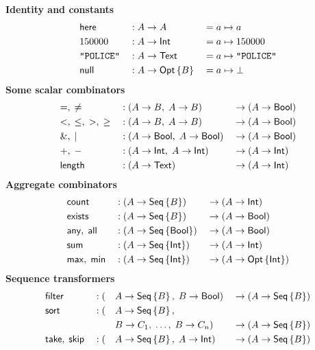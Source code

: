 \begin{table}
    \begin{framed}
    \textbf{Identity and constants}
    \begin{alignat*}{3}
        & \textup{\textsf{here}} && : A \to A && = a \mapsto a \\
        & 150000 && : A \to \textup{\textsf{Int}} && = a \mapsto 150000 \\
        & \texttt{"POLICE"} && : A \to \textup{\textsf{Text}} && = a \mapsto \texttt{"POLICE"} \\
        & \textup{\textsf{null}} && : A \to \textup{\textsf{Opt}}\left\{B\right\} && = a \mapsto \bot
    \end{alignat*}
    \textbf{Some scalar combinators}
    \begin{alignat*}{3}
        & {=},\;{\ne} && : (A \to B,\; A \to B) && \to (A \to \textup{\textsf{Bool}}) \\
        & {<},\;{\le},\;{>},\;{\ge} && : (A \to B,\; A \to B) && \to (A \to \textup{\textsf{Bool}}) \\
        & {\&},\;{|} && : (A \to \textup{\textsf{Bool}},\; A \to \textup{\textsf{Bool}}) && \to (A \to \textup{\textsf{Bool}}) \\
        & {+},\;{-} && : (A \to \textup{\textsf{Int}},\; A \to \textup{\textsf{Int}}) && \to (A \to \textup{\textsf{Int}}) \\
        & \textup{\textsf{length}} && : (A \to \textup{\textsf{Text}}) && \to (A \to \textup{\textsf{Int}})
    \end{alignat*}
    \textbf{Aggregate combinators}
    \begin{alignat*}{3}
        & \textup{\textsf{count}} && : (A \to \textup{\textsf{Seq}}\left\{B\right\}) && \to (A \to \textup{\textsf{Int}}) \\
        & \textup{\textsf{exists}} && : (A \to \textup{\textsf{Seq}}\left\{B\right\}) && \to (A \to \textup{\textsf{Bool}}) \\
        & \textup{\textsf{any}},\; \textup{\textsf{all}} && : (A \to \textup{\textsf{Seq}}\left\{\textup{\textsf{Bool}}\right\}) && \to (A \to \textup{\textsf{Bool}}) \\
        & \textup{\textsf{sum}} && : (A \to \textup{\textsf{Seq}}\left\{\textup{\textsf{Int}}\right\}) && \to (A \to \textup{\textsf{Int}}) \\
        & \textup{\textsf{max}},\; \textup{\textsf{min}} && : (A \to \textup{\textsf{Seq}}\left\{\textup{\textsf{Int}}\right\}) && \to (A \to \textup{\textsf{Opt}}\left\{\textup{\textsf{Int}}\right\})
    \end{alignat*}
    \textbf{Sequence transformers}
    \begin{alignat*}{4}
        & \Filter && : (&& A \to \Seq{B},\; B \to \Bool) && \to (A \to \Seq{B}) \\
        & \Sort && : (&& A \to \Seq{B},\; && \\
        & && && B \to C_1,\; \ldots,\; B \to C_n) && \to (A \to \Seq{B}) \\
        & \Take,\; \Skip && : (&& A \to \Seq{B},\; A \to \Int) && \to (A \to \Seq{B}) \\

\end{alignat*}
\end{framed}
\end{table}
